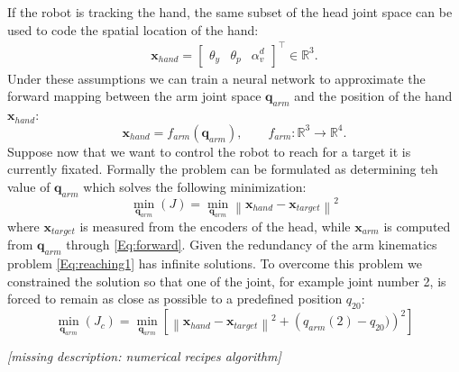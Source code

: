 If the robot is tracking the hand, the same subset of the head joint space can be used to code the spatial location of the hand:
%
\begin{eqnarray*}
\mathbf x_{hand}=
\begin{bmatrix} \theta_y & \theta_p & \alpha_v^d\end{bmatrix}^\top \in \mathbb R^3.
\end{eqnarray*}
%
Under these assumptions we can train a neural network to approximate the forward mapping between the arm joint space $\mathbf q_{arm}$ and the position of the hand $\mathbf x_{hand}$:
%
\begin{equation} 
\label{Eq:forward}
\mathbf x_{hand}=f_{arm}(\mathbf q_{arm}), \qquad f_{arm} : \mathbb R^3 \longrightarrow \mathbb R^4.\end{equation}
%
Suppose now that we want to control the robot to reach for a target it is currently 
fixated. Formally the problem can be formulated as determining teh value of $\mathbf q_{arm}$ 
which solves the following minimization:
%
\begin{equation} 
\label{Eq:reaching1}
  \displaystyle\min_{\mathbf q_{arm}}\left(J\right)=\displaystyle\min_{\mathbf q_{arm}}
  \left\|\mathbf x_{hand} - \mathbf x_{target}\right\|^2
\end{equation}
%
where $\mathbf x_{target}$ is measured from the encoders of the head, while 
$\mathbf x_{arm}$ is computed from $\mathbf q_{arm}$ through \ref{Eq:forward}. Given the 
redundancy of the arm kinematics problem \ref{Eq:reaching1} has infinite solutions. To 
overcome this problem we constrained the solution so that one of the joint, for example 
joint number 2, is forced to remain as close as possible to a predefined position $q_{20}$:
%
\begin{equation} 
\label{Eq:reaching2}
  \displaystyle\min_{\mathbf q_{arm}}\left(J_c\right)=\displaystyle\min_{\mathbf q_{arm}}
  \left[
  \left\|\mathbf x_{hand} - \mathbf x_{target}\right\|^2 + \left(q_{arm}(2)-q_{20})\right)^2
  \right]
\end{equation}

\emph{[missing description: numerical recipes algorithm]}

